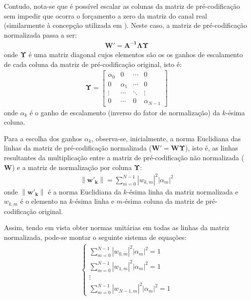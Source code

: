 Contudo, nota-se que é possível escalar as colunas da matriz de pré-codificação sem impedir que ocorra o forçamento a zero da matriz do canal real (similarmente à concepção utilizada em \cite{itutq4046}). Neste caso, a matriz de pré-codificação normalizada passa a ser:
\begin{align}
\mathbf{W'} = \mathbf{A^{-1} \Lambda} \mathbf{\Upsilon} 
\end{align}
onde $\mathbf{\Upsilon} $ é uma matriz diagonal cujos elementos são os os ganhos de escalamento de cada coluna da matriz de pré-codificação original, isto é:
\begin{align}
\mathbf{\Upsilon} = \left[\begin{array}{cccc}
\alpha_0 & 0 & \cdots & 0\\
0 & \alpha_1 & \cdots & 0\\
\vdots & \cdots & \ddots & \vdots\\
0 & \cdots & 0 & \alpha_{N-1}
\end{array}\right]
\end{align}
onde $\alpha_k$ é o ganho de escalamento (inverso do fator de normalização) da $k$-ésima coluna.

Para a escolha dos ganhos $\alpha_k$, observa-se, inicialmente, a norma Euclidiana das linhas da matriz de pré-codificação normalizada ($\mathbf{W'} = \mathbf{W \Upsilon}$), isto é, as linhas resultantes da multiplicação entre a matriz de pré-codificação não normalizada ($\mathbf{W}$) e a matriz de normalização por coluna $\mathbf{\Upsilon}$:
\begin{align}
\left\| \mathbf{w'_k}\right\| = \sum \limits_{m=0}^{N-1} \left| w_{k,m} \right|^2 \left| \alpha_m \right|^2
\end{align}
onde $\left\| \mathbf{w'_k}\right\|$ é a norma Euclidiana da $k$-ésima linha da matriz normalizada e $w_{k,m}$ é o elemento na $k$-ésima linha e $m$-ésima coluna da matriz de pré-codificação original.

Assim, tendo em vista obter normas unitárias em todas as linhas da matriz normalizada, pode-se montar o seguinte sistema de equações:
\begin{align}
\begin{cases}
\sum \limits_{m=0}^{N-1} \left| w_{0,m} \right|^2 \left| \alpha_m \right|^2 = 1\\
\sum \limits_{m=0}^{N-1} \left| w_{1,m} \right|^2 \left| \alpha_m \right|^2 = 1\\
\vdots\\
\sum \limits_{m=0}^{N-1} \left| w_{N-1,m} \right|^2 \left| \alpha_m \right|^2 = 1
\end{cases}
\label{eq:sistemas_eqs_alphas}
\end{align}

